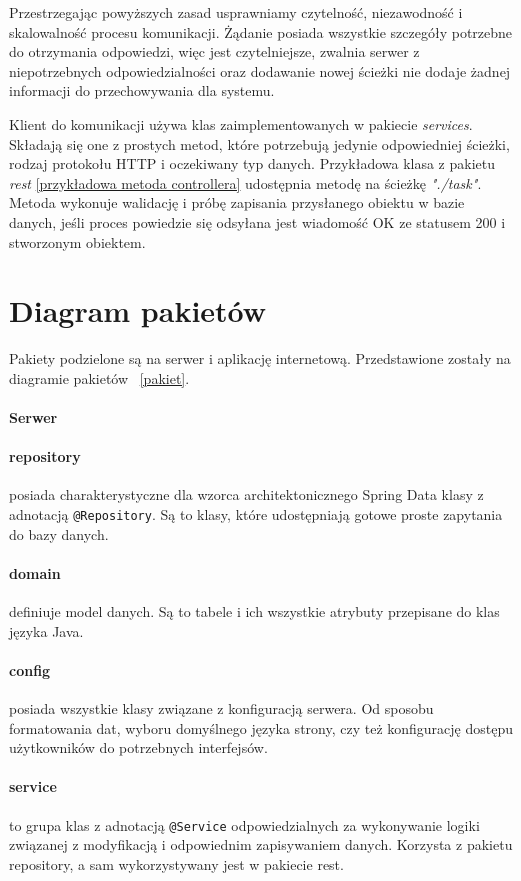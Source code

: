 Przestrzegając powyższych zasad usprawniamy czytelność,  niezawodność i skalowalność procesu komunikacji. Żądanie posiada wszystkie szczegóły potrzebne do otrzymania odpowiedzi, więc jest czytelniejsze, zwalnia serwer z niepotrzebnych odpowiedzialności oraz dodawanie nowej ścieżki nie dodaje żadnej informacji do przechowywania dla systemu. \cite{Rest}

Klient do komunikacji używa klas zaimplementowanych w pakiecie \textit{services}. Składają się one z prostych metod, które potrzebują jedynie odpowiedniej ścieżki, rodzaj protokołu HTTP i oczekiwany typ danych.
Przykładowa klasa z pakietu \textit{rest}  \ref{przykładowa metoda controllera}  udostępnia metodę na ścieżkę \textit{"./task"}. Metoda wykonuje walidację i próbę zapisania przysłanego obiektu w bazie danych, jeśli proces powiedzie się odsyłana jest wiadomość OK ze statusem 200 i stworzonym obiektem.

\clearpage
\section{Diagram pakietów}

Pakiety podzielone są na serwer i aplikację internetową. Przedstawione zostały na diagramie pakietów ~\ref{pakiet}.
\paragraph{Serwer }
\paragraph{repository}
posiada charakterystyczne dla wzorca architektonicznego Spring Data klasy z adnotacją \linebreak \texttt{@Repository}. Są to klasy, które udostępniają gotowe proste zapytania do
bazy danych.
\paragraph{domain}

definiuje model danych. Są to tabele i ich wszystkie atrybuty przepisane do klas języka Java.
\paragraph{config} posiada wszystkie klasy związane z konfiguracją serwera. Od sposobu formatowania dat, wyboru domyślnego języka strony, czy też konfigurację dostępu użytkowników do potrzebnych interfejsów.
\paragraph{service}  to grupa klas z adnotacją  \texttt{@Service} odpowiedzialnych za wykonywanie logiki związanej z modyfikacją i odpowiednim zapisywaniem danych. Korzysta z pakietu repository, a sam wykorzystywany jest w pakiecie rest.
